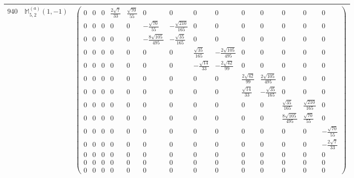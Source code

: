 \documentclass[fleqn,8pt,landscape]{jsarticle}
\begin{document}
\begin{center}
\begin{longtable}{ccc}
$ 940 $ & $ \mathbb{M}_{5,2}^{(a)}(1,-1) $ & $ \begin{pmatrix} 0 & 0 & 0 & \frac{2 \sqrt{7}}{33} & \frac{\sqrt{70}}{55} & 0 & 0 & 0 & 0 & 0 & 0 & 0 & 0 & 0 \\ 0 & 0 & 0 & 0 & 0 & - \frac{\sqrt{70}}{55} & - \frac{\sqrt{210}}{165} & 0 & 0 & 0 & 0 & 0 & 0 & 0 \\ 0 & 0 & 0 & 0 & 0 & - \frac{8 \sqrt{105}}{495} & - \frac{\sqrt{35}}{165} & 0 & 0 & 0 & 0 & 0 & 0 & 0 \\ 0 & 0 & 0 & 0 & 0 & 0 & 0 & \frac{\sqrt{35}}{165} & - \frac{2 \sqrt{105}}{495} & 0 & 0 & 0 & 0 & 0 \\ 0 & 0 & 0 & 0 & 0 & 0 & 0 & - \frac{\sqrt{14}}{33} & - \frac{2 \sqrt{42}}{99} & 0 & 0 & 0 & 0 & 0 \\ 0 & 0 & 0 & 0 & 0 & 0 & 0 & 0 & 0 & \frac{2 \sqrt{42}}{99} & \frac{2 \sqrt{105}}{495} & 0 & 0 & 0 \\ 0 & 0 & 0 & 0 & 0 & 0 & 0 & 0 & 0 & \frac{\sqrt{14}}{33} & - \frac{\sqrt{35}}{165} & 0 & 0 & 0 \\ 0 & 0 & 0 & 0 & 0 & 0 & 0 & 0 & 0 & 0 & 0 & \frac{\sqrt{35}}{165} & \frac{\sqrt{210}}{165} & 0 \\ 0 & 0 & 0 & 0 & 0 & 0 & 0 & 0 & 0 & 0 & 0 & \frac{8 \sqrt{105}}{495} & \frac{\sqrt{70}}{55} & 0 \\ 0 & 0 & 0 & 0 & 0 & 0 & 0 & 0 & 0 & 0 & 0 & 0 & 0 & - \frac{\sqrt{70}}{55} \\ 0 & 0 & 0 & 0 & 0 & 0 & 0 & 0 & 0 & 0 & 0 & 0 & 0 & - \frac{2 \sqrt{7}}{33} \\ 0 & 0 & 0 & 0 & 0 & 0 & 0 & 0 & 0 & 0 & 0 & 0 & 0 & 0 \\ 0 & 0 & 0 & 0 & 0 & 0 & 0 & 0 & 0 & 0 & 0 & 0 & 0 & 0 \\ 0 & 0 & 0 & 0 & 0 & 0 & 0 & 0 & 0 & 0 & 0 & 0 & 0 & 0 \end{pmatrix} $ \\ \hline

\end{longtable}
\end{center}
\end{document}
